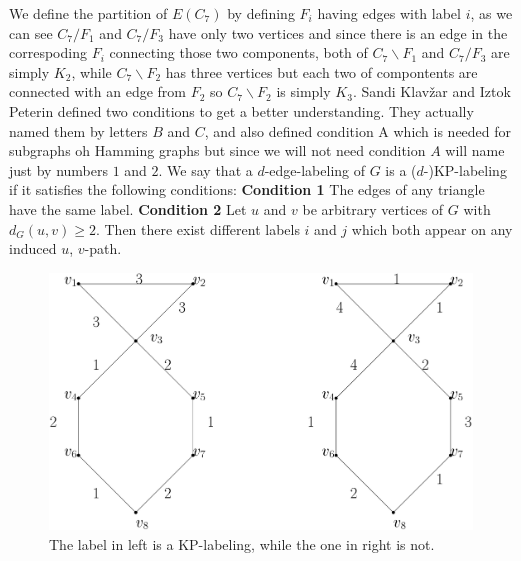 \documentclass[12pt,a4paper,titlepage,openany]{report}
\begin{document}
We define the partition of $E(C_7)$ by defining $F_i$ having edges with label $i$, as we can see $C_7/ F_1$ and $C_7/F_3$ have only two vertices and since there is an edge in the correspoding $F_i$ connecting those two components, both of  $C_7\backslash F_1$ and $C_7/F_3$ are simply $K_2$, while $C_7\backslash F_2$ has three vertices but each two of compontents are connected with an edge from $F_2$ so $C_7\backslash F_2$ is simply $K_3$.   
\newline
Sandi Klav\v zar and Iztok Peterin defined two conditions to get a better understanding. They actually named them by letters $B$ and $C$, and also defined condition A which is needed for subgraphs oh Hamming graphs but since we will not need condition $A$ will name just by numbers $1$ and $2$.\newline
We say that a $d$-edge-labeling of $G$ is a ($d$-)KP-labeling if it satisfies the following conditions:
\newline
\textbf{Condition 1} The edges of any triangle have the same label.\newline
\textbf{Condition 2} Let $u$ and $v$ be arbitrary vertices of $G$ with $d_G(u,v) \geq 2$. Then there exist different labels $i$ and $j$ which both appear on any induced $u$, $v$-path.\newline
\begin{figure}[h!]\label{kpexample}
\begin{center}
\includegraphics[width=1\linewidth]{figures/kpexample.png}
\end{center}
\caption{The label in left is a KP-labeling, while the one in right is not.}
\end{figure}
\end{document}
